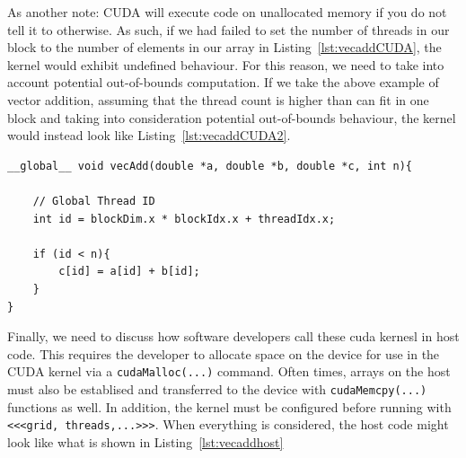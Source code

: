 As another note: CUDA will execute code on unallocated memory if you do not tell it to otherwise.
As such, if we had failed to set the number of threads in our block to the number of elements in our array in Listing~\ref{lst:vecaddCUDA}, the kernel would exhibit undefined behaviour.
For this reason, we need to take into account potential out-of-bounds computation.
If we take the above example of vector addition, assuming that the thread count is higher than can fit in one block and taking into consideration potential out-of-bounds behaviour, the kernel would instead look like Listing~\ref{lst:vecaddCUDA2}.

\begin{lstlisting}[float,label=lst:vecaddCUDA2, style=c++,caption={An example of a vector addition kernel in CUDA using blocks and threads, and ensuring no computation happens beyond the size of the array, $n$.}]
__global__ void vecAdd(double *a, double *b, double *c, int n){

    // Global Thread ID
    int id = blockDim.x * blockIdx.x + threadIdx.x;

    if (id < n){
        c[id] = a[id] + b[id];
    }
}
\end{lstlisting}

Finally, we need to discuss how software developers call these cuda kernesl in host code.
This requires the developer to allocate space on the device for use in the CUDA kernel via a \texttt{cudaMalloc(...)} command.
Often times, arrays on the host must also be establised and transferred to the device with \texttt{cudaMemcpy(...)} functions as well.
In addition, the kernel must be configured before running with \texttt{<<<grid, threads,...>>>}.
When everything is considered, the host code might look like what is shown in Listing~\ref{lst:vecaddhost}

